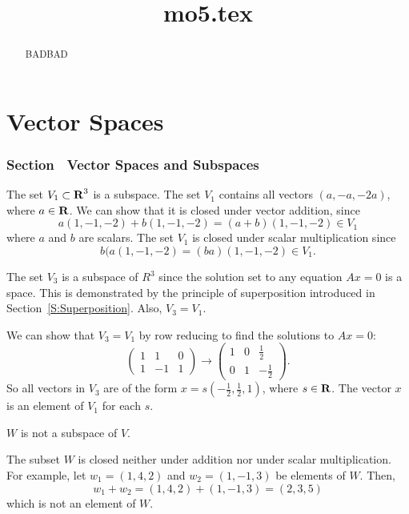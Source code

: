 \documentclass{ximera}
\title{mo5.tex}
\begin{document}
\begin{abstract}
BADBAD
\end{abstract}
\maketitle

\chapter{Vector Spaces}

\subsection*{Section~\protect{\ref{S:5.1}} Vector Spaces and Subspaces}

The set $V_1 \subset \mbox{$\bf{R}$}^3$ is a subspace.
The set $V_1$ contains all vectors $(a,-a,-2a)$,
where $a \in \mbox{$\bf{R}$}$.  We can show that it is closed under
vector addition, since
\[
a(1,-1,-2) + b(1,-1,-2) = (a + b)(1,-1,-2) \in V_1
\]
where $a$ and $b$ are scalars.  The set $V_1$ is closed under scalar
multiplication since
\[
b(a(1,-1,-2) = (ba)(1,-1,-2) \in V_1.
\]

The set $V_3$ is a subspace of $R^3$ since the solution set to
any equation $Ax = 0$ is a space.  This is demonstrated by the
principle of superposition introduced in Section~\ref{S:Superposition}.  
Also, $V_3 = V_1$.

\para   We can show that $V_3 = V_1$ by row reducing to find the
solutions to $Ax = 0$:
\[
\left(\begin{array}{rrr} 1 & 1 & 0 \\ 1 & -1 & 1
\end{array}\right) \longrightarrow \left(\begin{array}{rrr} 1 & 0 &
\frac{1}{2} \\ 0 & 1 & -\frac{1}{2} \end{array}\right).
\]
So all vectors in $V_3$ are of the form $x = s(-\frac{1}{2},
\frac{1}{2}, 1)$, where $s \in \mbox{$\bf{R}$}$.  The vector $x$ is an element
of $V_1$ for each $s$.

 \ans $W$ is not a subspace of $V$.

\soln The subset $W$ is closed neither under addition nor under scalar
multiplication.  For example, let $w_1 = (1,4,2)$ and $w_2 = (1,-1,3)$
be elements of $W$.  Then,
\[
w_1 + w_2 = (1,4,2) + (1,-1,3) = (2,3,5)
\]
which is not an element of $W$.
\end{document}
